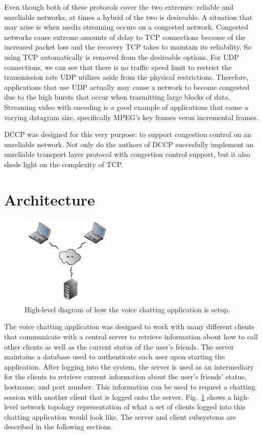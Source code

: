 \documentclass[letterpaper, 9 pt, balance, conference]{ieeeconf}
\begin{document}
Even though both of these protocols cover the two extremes: reliable and unreliable
networks, at times a hybrid of the two is desireable.  A situation
that may arise is when media streaming occurs on a congested network. 
Congested networks cause extreme amounts of delay to TCP connections because of
the increased packet loss and the recovery TCP takes to maintain its reliability. 
So using TCP automatically is removed from the desireable options.  For
UDP connections, we can see that there is no traffic speed limit to restrict the
transmission rate UDP utilizes aside from the physical restrictions.  Therefore, 
applications that use UDP actually
may cause a network to become congested due to the high bursts that occur when
trasmitting large blocks of data.  Streaming video with encoding is a good example 
of applications that cause a varying datagram size, specifically MPEG's key frames
verus incremental frames.

DCCP was designed for this very purpose: to support congestion control on an 
unreliable network.  Not only do the authors of DCCP succesfully implement an 
unreliable transport layer protocol with congestion control support, but it also 
sheds light on the complexity of TCP.

\section{Architecture}
\label{sec:architec}

\begin{figure}[h]
   \centering
      \includegraphics[width=0.4\textwidth]{pics/setup}
   \caption{High-level diagram of how the voice chatting application is setup.}
\label{fig:setup}
\end{figure}

The voice chatting application was designed to work with many different clients
that communicate with a central server to retrieve information about how to call
other clients as well as the current status of the user's friends. The server 
maintains a database used to authenticate each user upon starting the application.
After logging into the system, the server is used as an intermediary for the clients
to retrieve current information about the user's friends' status, hostname, and
port number. This information can be used to request a chatting session with another
client that is logged onto the server.  Fig.~\ref{fig:setup} shows a high-level
network topology representation of what a set of clients logged into this chatting 
application would look like.  The server and client subsystems are described in
the following sections.
\end{document}

